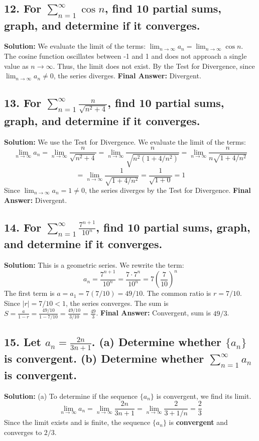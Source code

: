 \documentclass{article}
\begin{document}
\subsection*{12. For $\sum_{n=1}^{\infty} \cos n$, find 10 partial sums, graph, and determine if it converges.}
\textbf{Solution:}
We evaluate the limit of the terms: $\lim_{n \to \infty} a_n = \lim_{n \to \infty} \cos n$.
The cosine function oscillates between -1 and 1 and does not approach a single value as $n \to \infty$. Thus, the limit does not exist.
By the Test for Divergence, since $\lim_{n \to \infty} a_n \neq 0$, the series diverges.
\textbf{Final Answer:} Divergent.

\subsection*{13. For $\sum_{n=1}^{\infty} \frac{n}{\sqrt{n^2+4}}$, find 10 partial sums, graph, and determine if it converges.}
\textbf{Solution:}
We use the Test for Divergence. We evaluate the limit of the terms:
\[ \lim_{n \to \infty} a_n = \lim_{n \to \infty} \frac{n}{\sqrt{n^2+4}} = \lim_{n \to \infty} \frac{n}{\sqrt{n^2(1+4/n^2)}} = \lim_{n \to \infty} \frac{n}{n\sqrt{1+4/n^2}} \]
\[ = \lim_{n \to \infty} \frac{1}{\sqrt{1+4/n^2}} = \frac{1}{\sqrt{1+0}} = 1 \]
Since $\lim_{n \to \infty} a_n = 1 \neq 0$, the series diverges by the Test for Divergence.
\textbf{Final Answer:} Divergent.

\subsection*{14. For $\sum_{n=1}^{\infty} \frac{7^{n+1}}{10^n}$, find 10 partial sums, graph, and determine if it converges.}
\textbf{Solution:}
This is a geometric series. We rewrite the term:
\[ a_n = \frac{7^{n+1}}{10^n} = \frac{7 \cdot 7^n}{10^n} = 7 \left(\frac{7}{10}\right)^n \]
The first term is $a = a_1 = 7(7/10) = 49/10$. The common ratio is $r = 7/10$.
Since $|r| = 7/10 < 1$, the series converges.
The sum is $S = \frac{a}{1-r} = \frac{49/10}{1 - 7/10} = \frac{49/10}{3/10} = \frac{49}{3}$.
\textbf{Final Answer:} Convergent, sum is $49/3$.

\subsection*{15. Let $a_n = \frac{2n}{3n+1}$. (a) Determine whether $\{a_n\}$ is convergent. (b) Determine whether $\sum_{n=1}^{\infty} a_n$ is convergent.}
\textbf{Solution:}
(a) To determine if the sequence $\{a_n\}$ is convergent, we find its limit.
\[ \lim_{n \to \infty} a_n = \lim_{n \to \infty} \frac{2n}{3n+1} = \lim_{n \to \infty} \frac{2}{3+1/n} = \frac{2}{3} \]
Since the limit exists and is finite, the sequence $\{a_n\}$ is \textbf{convergent} and converges to $2/3$.
\end{document}
